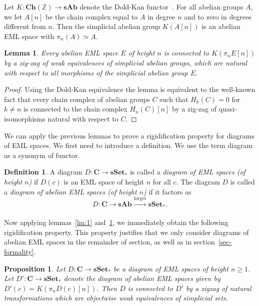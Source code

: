 \documentclass{amsart}
\newtheorem{proposition}[formula]{Proposition}
\newtheorem{lemma}[formula]{Lemma}
\theoremstyle{definition}
\newtheorem{definition}[formula]{Definition}
\theoremstyle{remark}
\renewcommand{\ge}{\geqslant}
\newcommand{\Cc}{\mathbf{C}}
\newcommand{\sset}{\mathbf{sSet}}
\newcommand{\sab}{\mathbf{sAb}}
\begin{document}
Let $K:\mathbf{Ch}(\mathbb{Z})\to \sab$ denote the Dold-Kan functor~\cite[Chapter~8, \S8.4]{we-97}. For all abelian groups $A$, we let $A[n]$ be the chain complex equal to $A$ in degree $n$ and to zero in degrees different from $n$. Then the simplicial abelian group $K(A[n])$ is an abelian EML space with $\pi_n(A)\simeq A$. 
\begin{lemma}\label{lm:2}
	Every abelian EML space $E$ of height $n$ is connected to $K(\pi_nE[n])$ by a zig-zag of weak equivalences of simplicial abelian groups, which are natural with respect to all morphisms of the simplicial abelian group $E$.
\end{lemma}
\begin{proof}
	Using the Dold-Kan equivalence the lemma is equivalent to the well-known fact that every chain complex of abelian groups $C$ such that $H_k(C)=0$ for $k\ne n$ is connected to the chain complex $H_n(C)[n]$ by a zig-zag of quasi-isomorphisms natural with respect to $C$.
\end{proof}

We can apply the previous lemmas to prove a rigidification property for diagrams of EML spaces.
We first need to introduce a definition. We use the term diagram as a synonym of functor.

\begin{definition}
	A diagram $D:\Cc\to \sset_{*}$ is called a \emph{diagram of EML spaces (of height $n$)}
	if $D(c)$ is an EML space of height $n$ for all $c$.
	The diagram $D$ is called a \emph{diagram of abelian EML spaces (of height $n$)} if it factors as
	\[
	D\colon \Cc \xrightarrow[]{} \sab \xrightarrow[]{\mathrm{forget}}\sset_{*}. 
	\]  %
\end{definition}

Now applying lemmas~\ref{lm:1} and~\ref{lm:2}, we immediately obtain the following rigidification property. This property justifies that we only consider diagrams of abelian EML spaces in the remainder of section, as well as in section~\ref{sec-formality}.
\begin{proposition}\label{pr:zigzagofdiagramsofEML}
	Let $D:\Cc\to \sset_*$ be a diagram of EML spaces of height $n\ge 1$. Let $D':\Cc\to \sset_*$ denote the diagram of abelian EML spaces given by $D'(c)=K(\pi_nD(c)[n])$. Then $D$ is connected to $D'$ by a zigzag of natural transformations which are objectwise weak equivalences of simplicial sets.   
\end{proposition}
\end{document}
